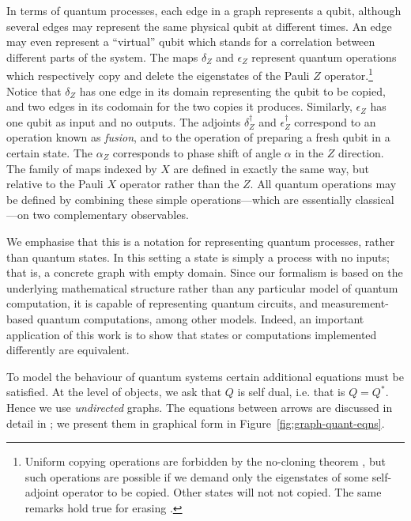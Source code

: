 \documentclass[runningheads]{llncs}
\begin{document}
In terms of quantum processes, each edge in a graph represents a
qubit, although several edges may represent the same physical qubit at
different times.  An edge may even represent a ``virtual'' qubit which
stands for a correlation between different parts of the system.  The
maps $\delta_Z$ and $\epsilon_Z$ represent quantum operations which
respectively copy and delete the eigenstates of the Pauli $Z$
operator.\footnote{Uniform copying operations are forbidden by the
  no-cloning theorem \cite{Wootters1982A-single-quantu}, but such operations are
  possible if we demand only the eigenstates of some self-adjoint
  operator to be copied.  Other states will not not copied.  The same
  remarks hold true for erasing \cite{Pati2000Impossibility-o}.}  Notice that $\delta_Z$ has one edge
in its domain representing the qubit to be copied, and two edges in
its codomain for the two copies it produces.  Similarly, $\epsilon_Z$
has one qubit as input and no outputs.  The adjoints $\delta^\dag_Z$
and $\epsilon^\dag_Z$ correspond to an operation known as
\emph{fusion}, and to the operation of preparing a fresh qubit in a
certain state.  The $\alpha_Z$ corresponds to phase shift of angle
$\alpha$ in the $Z$ direction.  The family of maps indexed by $X$ are
defined in exactly the same way, but relative to the Pauli $X$
operator rather than the $Z$.  All quantum operations may be defined
by combining these simple operations---which are essentially
classical---on two complementary observables.

We emphasise that this is a notation for representing quantum
processes, rather than quantum states.  In this setting a state is
simply a process with no inputs; that is, a concrete graph with
empty domain.
  Since our formalism is based on the
underlying mathematical structure rather than any particular model of
quantum computation, it is capable of representing  quantum circuits,
and measurement-based quantum computations, among other models.
Indeed, an important application of this work is to show that states or 
computations implemented differently are equivalent.

To model the behaviour of quantum systems certain additional equations
must be satisfied.  At the  level of objects, we ask that  $Q$ is
self dual, i.e. that is $Q = Q^*$.  Hence we use \emph{undirected}
graphs.  The equations between arrows are discussed in detail in
\cite{Coecke:2008jo};  we present them in graphical form in
Figure~\ref{fig:graph-quant-eqns}.
\end{document}
